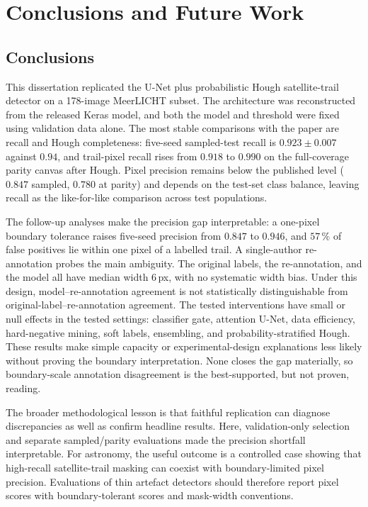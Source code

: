 \documentclass{cam-thesis}
\begin{document}
\chapter{Conclusions and Future Work}
\label{ch:conclusions}

\section{Conclusions}
\label{sec:conclusions}

This dissertation replicated the \citet{stoppa2024} U-Net plus probabilistic
Hough satellite-trail detector on a 178-image MeerLICHT subset. The architecture
was reconstructed from the released Keras model, and both the model and
threshold were fixed using validation data alone. The most stable comparisons
with the paper are recall and Hough completeness: five-seed sampled-test recall
is $0.923\pm0.007$ against $0.94$, and trail-pixel recall rises from $0.918$ to
$0.990$ on the full-coverage parity canvas after Hough. Pixel precision remains
below the published level ($0.847$ sampled, $0.780$ at parity) and depends on
the test-set class balance, leaving recall as the like-for-like comparison
across test populations.

The follow-up analyses make the precision gap interpretable: a one-pixel
boundary tolerance raises five-seed precision from $0.847$ to $0.946$, and
$57\,\%$ of false positives lie within one pixel of a labelled trail. A
single-author re-annotation probes the main ambiguity. The original labels, the
re-annotation, and the model all have median width $6$\,px, with no systematic
width bias. Under this design, model--re-annotation agreement is not
statistically distinguishable from original-label--re-annotation agreement. The
tested interventions have small or null effects in the tested settings:
classifier gate, attention U-Net, data efficiency, hard-negative mining, soft
labels, ensembling, and probability-stratified Hough. These results make simple
capacity or experimental-design explanations less likely without proving the
boundary interpretation. None closes the gap materially, so boundary-scale
annotation disagreement is the best-supported, but not proven, reading.

The broader methodological lesson is that faithful replication can diagnose
discrepancies as well as confirm headline results. Here, validation-only
selection and separate sampled/parity evaluations made the precision shortfall
interpretable. For astronomy, the useful outcome is a controlled case showing
that high-recall satellite-trail masking can coexist with boundary-limited pixel
precision. Evaluations of thin artefact detectors should therefore report pixel
scores with boundary-tolerant scores and mask-width conventions.
\end{document}
